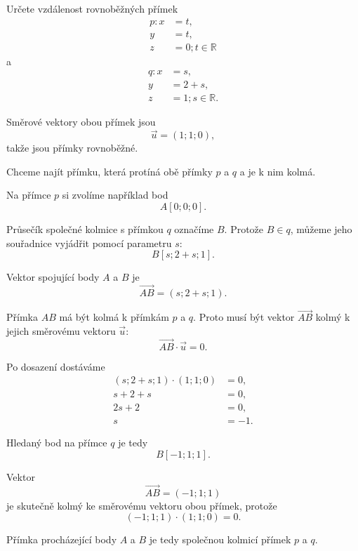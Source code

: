 \begin{example}
    \label{exa:Distance_parallel_lines_geometrically}

    Určete vzdálenost rovnoběžných přímek
    \[
        \begin{aligned}
            p: x&=t,\\
            y&=t,\\
            z&=0; t\in\mathbb{R}
        \end{aligned}
    \]
    a
    \[
        \begin{aligned}
            q: x&=s,\\
            y&=2+s,\\
            z&=1; s\in\mathbb{R}.
        \end{aligned}
    \]

    Směrové vektory obou přímek jsou
    \[
        \vec{u}=(1;1;0),
    \]
    takže jsou přímky rovnoběžné.

    Chceme najít přímku, která protíná obě přímky $p$ a $q$
    a je k nim kolmá.

    Na přímce $p$ si zvolíme například bod
    \[
        A[0;0;0].
    \]

    Průsečík společné kolmice s přímkou $q$ označíme $B$.
    Protože $B\in q$, můžeme jeho souřadnice vyjádřit pomocí
    parametru $s$:
    \[
        B[s;2+s;1].
    \]

    Vektor spojující body $A$ a $B$ je
    \[
        \overrightarrow{AB}
        =
        (s;2+s;1).
    \]

    Přímka $AB$ má být kolmá k přímkám $p$ a $q$.
    Proto musí být vektor $\overrightarrow{AB}$ kolmý
    k jejich směrovému vektoru $\vec{u}$:
    \[
        \overrightarrow{AB}\cdot\vec{u}=0.
    \]

    Po dosazení dostáváme
    \begin{align*}
        (s;2+s;1)\cdot(1;1;0)&=0,\\
        s+2+s&=0,\\
        2s+2&=0,\\
        s&=-1.
    \end{align*}

    Hledaný bod na přímce $q$ je tedy
    \[
        B[-1;1;1].
    \]

    Vektor
    \[
        \overrightarrow{AB}=(-1;1;1)
    \]
    je skutečně kolmý ke směrovému vektoru obou přímek, protože
    \[
        (-1;1;1)\cdot(1;1;0)=0.
    \]

    Přímka procházející body $A$ a $B$ je tedy společnou kolmicí
    přímek $p$ a $q$.


\end{example}
